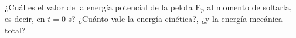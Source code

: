 ¿Cuál es el valor de la energía potencial de la
pelota E$_p$ al momento de soltarla, es decir, en $t = 0$ s? ¿Cuánto vale la energía
cinética?, ¿y la energía mecánica total?


\begin{solutionbox}{1.5cm}

\end{solutionbox}
